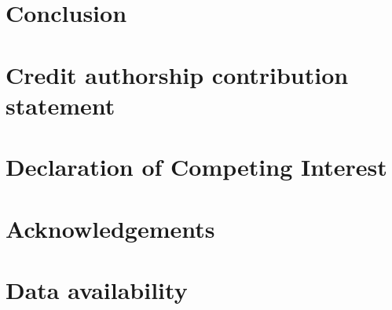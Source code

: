 \documentclass[
  super,
  preprint,
  3p]{elsarticle}
\begin{document}
\hypertarget{conclusion}{%
\section{Conclusion}\label{conclusion}}

\hypertarget{credit-authorship-contribution-statement}{%
\section*{Credit authorship contribution
statement}\label{credit-authorship-contribution-statement}}

\hypertarget{declaration-of-competing-interest}{%
\section*{Declaration of Competing
Interest}\label{declaration-of-competing-interest}}

\hypertarget{acknowledgements}{%
\section*{Acknowledgements}\label{acknowledgements}}

\hypertarget{data-availability}{%
\section*{Data availability}\label{data-availability}}


\renewcommand\refname{References}
  
\end{document}
